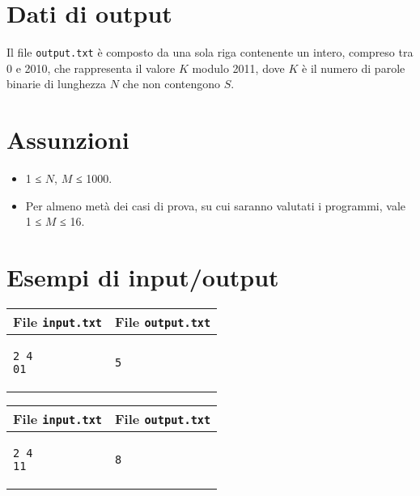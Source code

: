 \documentclass[a4paper,11pt]{article}
\begin{document}
\section*{Dati di output}
  
Il file \texttt{output.txt} è composto da una sola riga
contenente un intero, compreso tra 0 e 2010, che rappresenta il valore
$K$ modulo 2011, dove $K$ è il numero di
parole binarie di lunghezza $N$ che non contengono
$S$.

  \section*{Assunzioni}
  \begin{itemize}
  
    \item  1 ≤ $N$, $M$ ≤ 1000.
    \item  Per almeno metà dei casi di prova, su cui saranno valutati i programmi, vale 1 ≤ $M$ ≤ 16.
  \end{itemize}

\section*{Esempi di input/output}

  
    \noindent
    \begin{tabular}{p{11cm}|p{5cm}}
    \toprule
    \textbf{File \texttt{input.txt}}
    & \textbf{File \texttt{output.txt}}
    \\
    \midrule
    \scriptsize
    \begin{verbatim}
2 4
01
\end{verbatim}
    &
    \scriptsize
    \begin{verbatim}
5
\end{verbatim}
    \\
    \bottomrule
    \end{tabular}
  
    \noindent
    \begin{tabular}{p{11cm}|p{5cm}}
    \toprule
    \textbf{File \texttt{input.txt}}
    & \textbf{File \texttt{output.txt}}
    \\
    \midrule
    \scriptsize
    \begin{verbatim}
2 4
11
\end{verbatim}
    &
    \scriptsize
    \begin{verbatim}
8
\end{verbatim}
    \\
    \bottomrule
    \end{tabular}
  
\end{document}
